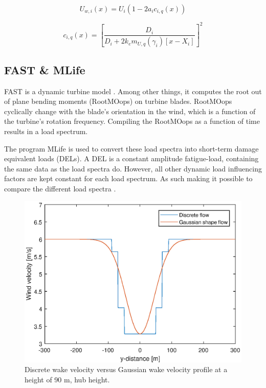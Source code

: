 \begin{equation}
\label{eq:Uw}
U_{w,i}(x) = U_i\left( {1-2a_{i}c_{i,q}(x)} \right)
\end{equation} 

\begin{equation}
\label{eq:c}
c_{i,q}(x) = \left[ \frac{D_i}{D_i + 2k_em_{U,q}(\gamma_i)[x - X_i]} \right]^2
\end{equation}



\subsection{FAST \& MLife} \label{sec:fast} FAST is a dynamic turbine model \cite{Jonkman2005}. Among other things, it computes the root out of plane bending moments (RootMOops) on turbine blades. RootMOops cyclically change with the blade's orientation in the wind, which is a function of the turbine's rotation frequency. Compiling the RootMOops as a function of time results in a load spectrum.

The program MLife is used to convert these load spectra into short-term damage equivalent loads (DELs). A DEL is a constant amplitude fatigue-load, containing the same data as the load spectra do. However, all other dynamic load influencing factors are kept constant for each load spectrum. As such making it possible to compare the different load spectra \cite{Wilson2017, MLife}.


\begin{figure}
  \includegraphics[width=\linewidth]{./Figures/PlotGausDiscWakeDWake180U6yaw0.eps} %
  \caption{Discrete wake velocity versus Gaussian wake velocity profile at a height of 90 m, hub height.} %
  \label{fig:disgaus}
\end{figure}

